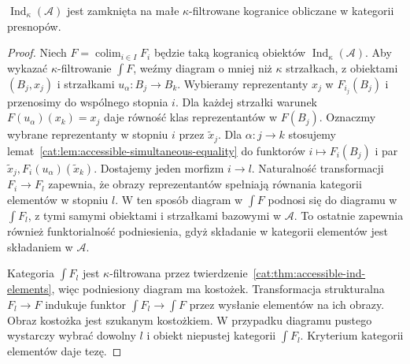 \begin{stwierdzenie}\label{cat:prop:accessible-ind-closure}
$\operatorname{Ind}_\kappa(\mathcal A)$ jest zamknięta na małe $\kappa$-filtrowane kogranice obliczane w kategorii presnopów.
\end{stwierdzenie}
\begin{proof}
Niech $F=\operatorname{colim}_{i\in I}F_i$ będzie taką kogranicą obiektów $\operatorname{Ind}_\kappa(\mathcal A)$. Aby wykazać $\kappa$-filtrowanie $\int F$, weźmy diagram o mniej niż $\kappa$ strzałkach, z obiektami $(B_j,x_j)$ i strzałkami $u_\alpha:B_j\to B_k$. Wybieramy reprezentanty $x_j$ w $F_{i_j}(B_j)$ i przenosimy do wspólnego stopnia $i$. Dla każdej strzałki warunek $F(u_\alpha)(x_k)=x_j$ daje równość klas reprezentantów w $F(B_j)$. Oznaczmy wybrane reprezentanty w stopniu $i$ przez $\widetilde x_j$. Dla $\alpha:j\to k$ stosujemy lemat~\ref{cat:lem:accessible-simultaneous-equality} do funktorów $i\mapsto F_i(B_j)$ i par $\widetilde x_j,F_i(u_\alpha)(\widetilde x_k)$. Dostajemy jeden morfizm $i\to l$. Naturalność transformacji $F_i\to F_l$ zapewnia, że obrazy reprezentantów spełniają równania kategorii elementów w stopniu $l$. W ten sposób diagram w $\int F$ podnosi się do diagramu w $\int F_l$, z tymi samymi obiektami i strzałkami bazowymi w $\mathcal A$. To ostatnie zapewnia również funktorialność podniesienia, gdyż składanie w kategorii elementów jest składaniem w $\mathcal A$.

Kategoria $\int F_l$ jest $\kappa$-filtrowana przez twierdzenie~\ref{cat:thm:accessible-ind-elements}, więc podniesiony diagram ma kostożek. Transformacja strukturalna $F_l\to F$ indukuje funktor $\int F_l\to\int F$ przez wysłanie elementów na ich obrazy. Obraz kostożka jest szukanym kostożkiem. W przypadku diagramu pustego wystarczy wybrać dowolny $l$ i obiekt niepustej kategorii $\int F_l$. Kryterium kategorii elementów daje tezę.
\end{proof}

